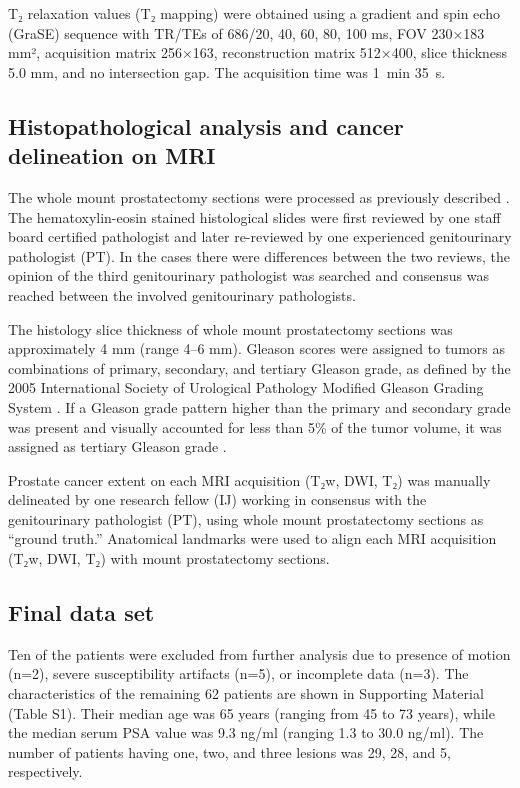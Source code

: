 T₂ relaxation values (T₂ mapping) were obtained using a gradient and spin echo
(GraSE) sequence with TR/TEs of 686/20, 40, 60, 80, 100 ms, FOV 230×183 mm²,
acquisition matrix 256×163, reconstruction matrix 512×400, slice thickness 5.0
mm, and no intersection gap. The acquisition time was 1~min 35~s.


\subsection{Histopathological analysis and cancer delineation on MRI}

The whole mount prostatectomy sections were processed as previously described
\citep{Jambor2015Evaluation, Jambor2015Rotating}. The hematoxylin-eosin stained
histological slides were first reviewed by one staff board certified pathologist
and later re-reviewed by one experienced genitourinary pathologist (PT). In the
cases there were differences between the two reviews, the opinion of the third
genitourinary pathologist was searched and consensus was reached between the
involved genitourinary pathologists.

The histology slice thickness of whole mount prostatectomy sections was
approximately 4 mm (range 4--6 mm). Gleason scores were assigned to tumors as
combinations of primary, secondary, and tertiary Gleason grade, as defined by
the 2005 International Society of Urological Pathology Modified Gleason Grading
System \citep{Epstein2005}. If a Gleason grade pattern higher than the primary
and secondary grade was present and visually accounted for less than 5\% of the
tumor volume, it was assigned as tertiary Gleason grade \citep{Epstein2010}.

Prostate cancer extent on each MRI acquisition (T₂w, DWI, T₂) was manually
delineated by one research fellow (IJ) working in consensus with the
genitourinary pathologist (PT), using whole mount prostatectomy sections as
``ground truth.'' Anatomical landmarks were used to align each MRI acquisition
(T₂w, DWI, T₂) with mount prostatectomy sections.


\subsection{Final data set}

Ten of the patients were excluded from further analysis due to presence of
motion (n=2), severe susceptibility artifacts (n=5), or incomplete data (n=3).
The characteristics of the remaining 62 patients are shown in Supporting
Material (Table S1). Their median age was 65 years (ranging from 45 to 73
years), while the median serum PSA value was 9.3 ng/ml (ranging 1.3 to 30.0
ng/ml). The number of patients having one, two, and three lesions was 29, 28,
and 5, respectively.

